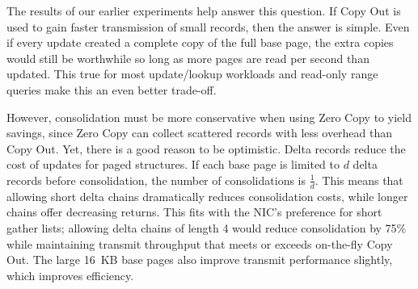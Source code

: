 


The results of our earlier experiments help answer this question.  If Copy Out
is used to gain faster transmission of small records, then the answer is
simple. Even if every update created a complete copy of the full base page, the
extra copies would still be worthwhile so long as more pages are read per
second than updated. This true for most update/lookup workloads and read-only
range queries make this an even better trade-off.

However, consolidation must be more conservative when using Zero Copy to yield
savings, since Zero Copy can collect scattered records with less overhead than
Copy Out. Yet, there is a good reason to be optimistic.  Delta records
reduce the cost of updates for paged structures. If each base page is limited
to $d$ delta records before consolidation, the number of consolidations is
$\frac{1}{d}$. This means that allowing short delta chains dramatically reduces
consolidation costs, while longer chains offer decreasing returns. This fits with
the NIC's preference for short gather lists; allowing delta chains of length 4
would reduce consolidation by 75\% while maintaining transmit throughput that
meets or exceeds on-the-fly Copy Out.  The large 16~KB base pages also
improve transmit performance slightly, which improves efficiency.


